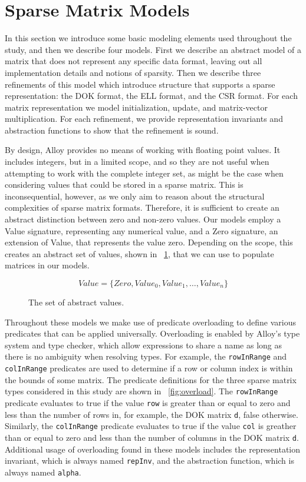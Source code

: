 \section{Sparse Matrix Models}
\label{sec:models}

In this section we introduce some basic modeling elements used throughout the study, and then we describe four models.  First we describe an abstract model of a matrix that does not represent any specific data format, leaving out all implementation details and notions of sparsity. Then we describe three refinements of this model which introduce structure that supports a sparse representation: the DOK format, the ELL format, and the CSR format.  For each matrix representation we model initialization, update, and matrix-vector multiplication.  For each refinement, we provide representation invariants and abstraction functions to show that the refinement is sound.

By design, Alloy provides no means of working with floating point values.  It includes integers, but in a limited scope, and so they are not useful when attempting to work with the complete integer set, as might be the case when considering values that could be stored in a sparse matrix.  This is inconsequential, however, as we only aim to reason about the structural complexities of sparse matrix formats.  Therefore, it is sufficient to create an abstract distinction between zero and non-zero values.  Our models employ a Value signature, representing any numerical value, and a Zero signature, an extension of Value, that represents the value zero.  Depending on the scope, this creates an abstract set of values, shown in \figurename~\ref{fig:values}, that we can use to populate matrices in our models.

\begin{figure}
\begin{displaymath}
Value = \{Zero, Value_0, Value_1, \ldots, Value_n\}
\end{displaymath}
\caption{The set of abstract values.}
\label{fig:values}
\end{figure}

Throughout these models we make use of predicate overloading to define various predicates that can be applied universally.  Overloading is enabled by Alloy's type system and type checker, which allow expressions to share a name as long as there is no ambiguity when resolving types.  For example, the \texttt{rowInRange} and \texttt{colInRange} predicates are used to determine if a row or column index is within the bounds of some matrix.  The predicate definitions for the three sparse matrix types considered in this study are shown in \figurename~\ref{fig:overload}.  The \texttt{rowInRange} predicate evaluates to true if the value \texttt{row} is greater than or equal to zero and less than the number of rows in, for example, the DOK matrix \texttt{d}, false otherwise.  Similarly, the \texttt{colInRange} predicate evaluates to true if the value \texttt{col} is greather than or equal to zero and less than the number of columns in the DOK matrix \texttt{d}.  Additional usage of overloading found in these models includes the representation invariant, which is always named \texttt{repInv}, and the abstraction function, which is always named \texttt{alpha}.

